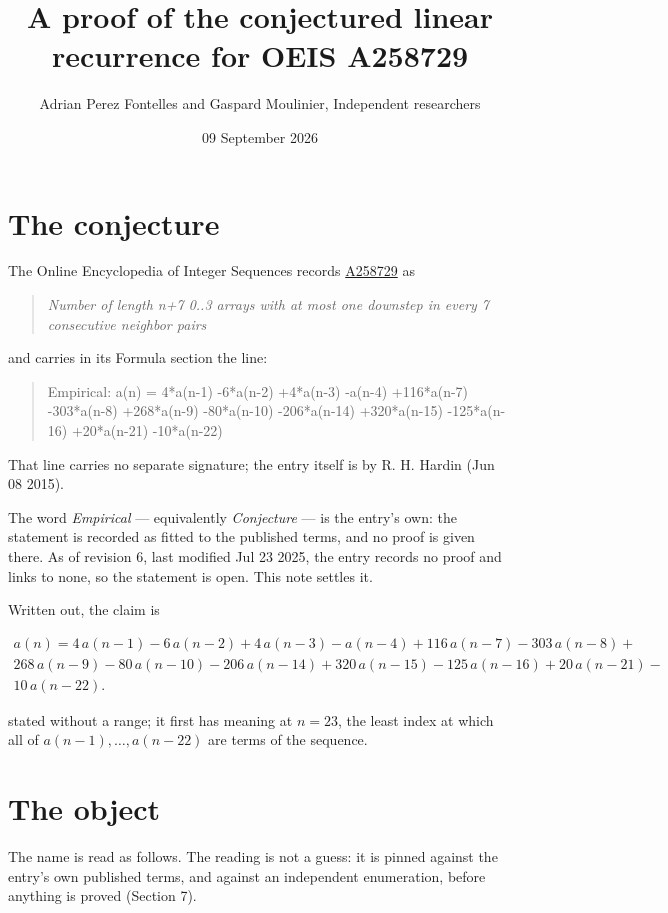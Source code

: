 \documentclass[11pt]{article}
\title{A proof of the conjectured linear recurrence for OEIS A258729}
\author{Adrian Perez Fontelles and Gaspard Moulinier, Independent researchers}
\date{09 September 2026}
\theoremstyle{definition}
\begin{document}
\maketitle
\section{The conjecture}

The Online Encyclopedia of Integer Sequences records \href{https://oeis.org/A258729}{A258729} as

\begin{quote}\itshape Number of length n+7 0..3 arrays with at most one downstep in every 7 consecutive neighbor pairs\end{quote}

and carries in its Formula section the line:

\begin{quote}\ttfamily Empirical: a(n) = 4*a(n-1) -6*a(n-2) +4*a(n-3) -a(n-4) +116*a(n-7) -303*a(n-8) +268*a(n-9) -80*a(n-10) -206*a(n-14) +320*a(n-15) -125*a(n-16) +20*a(n-21) -10*a(n-22)\end{quote}

That line carries no separate signature; the entry itself is by R. H. Hardin (Jun 08 2015).

The word {\itshape Empirical} --- equivalently {\itshape Conjecture} --- is the entry's own: the statement is recorded as fitted to the published terms, and no proof is given there. As of revision 6, last modified Jul 23 2025, the entry records no proof and links to none, so the statement is open. This note settles it.

Written out, the claim is

\begin{multline*} a(n) = 4\,a(n-1) - 6\,a(n-2) + 4\,a(n-3) - a(n-4) + 116\,a(n-7) - 303\,a(n-8) + \\ 268\,a(n-9) - 80\,a(n-10) - 206\,a(n-14) + 320\,a(n-15) - 125\,a(n-16) + 20\,a(n-21) - \\ 10\,a(n-22). \end{multline*}

stated without a range; it first has meaning at $n = 23$, the least index at which all of $a(n-1),\dots,a(n-22)$ are terms of the sequence.

\section{The object}

The name is read as follows. The reading is not a guess: it is pinned against the entry's own published terms, and against an independent enumeration, before anything is proved (Section 7).
\end{document}
